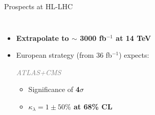 \begin{frame}{Prospects at HL-LHC}
\begin{columns}
\begin{itemize}
    \item \textbf{Extrapolate to \textcolor{HHturquoise_d}{$\sim$ 3000 fb$^{-1}$ at 14 TeV}}
    \item European strategy (from 36 fb$^{-1}$) expects: 
    \begin{center}
       \textit{ \textcolor{gray}{ATLAS+CMS}}
    \end{center}
    \begin{itemize}
        \item Significance of \textbf{\textcolor{HHred}{4$\sigma$}}
        \item \textbf{$\kappa_{\lambda} = 1 \pm 50\%$ at 68\% CL}
    \end{itemize}
\end{itemize}
\end{columns}    
\end{frame}

